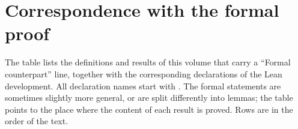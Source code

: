 \chapter{Correspondence with the formal proof}\label{app:formal}

The table lists the definitions and results of this volume that carry a ``Formal counterpart''
line, together with the corresponding declarations of the Lean development. All declaration
names start with . The formal statements are sometimes slightly more general, or are
split differently into lemmas; the table points to the place where the content of each result is
proved. Rows are in the order of the text.

